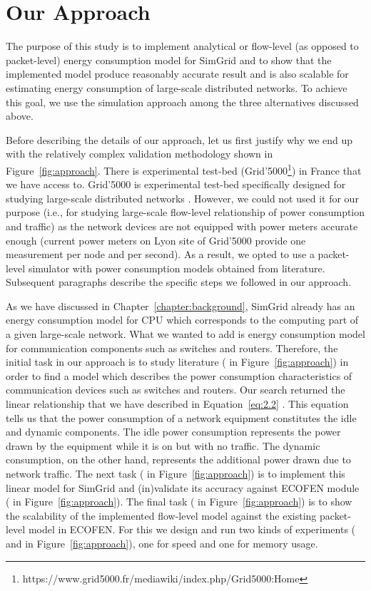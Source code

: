\section{Our Approach}
\label{section:ourapproach}
The purpose of this study is to implement analytical or flow-level (as opposed to packet-level) energy consumption model for SimGrid and to show that the implemented model produce reasonably accurate result and is also scalable for estimating energy consumption of large-scale distributed networks. To achieve this goal, we use the simulation approach among the three alternatives discussed above. 

Before describing the details of our approach, let us first justify why we end up with the relatively complex validation methodology shown in Figure~\ref{fig:approach}. There is experimental test-bed (Grid'5000\footnote{https://www.grid5000.fr/mediawiki/index.php/Grid5000:Home}) in France that we have access to. Grid'5000 is experimental test-bed specifically designed for studying large-scale distributed networks \cite{DBLP:journals/ijhpca/BolzeCCDDJJLLMMNPQRTT06}. However, we could not used it for our purpose (i.e., for studying large-scale flow-level relationship of power consumption and traffic) as the network devices are not equipped with power meters accurate enough (current power meters on Lyon site of Grid'5000 provide one measurement per node and per second). As a result, we opted to use a packet-level simulator with power consumption models obtained from literature. Subsequent paragraphs describe the specific steps we followed in our approach.

As we have discussed in Chapter~\ref{chapter:background}, SimGrid already has an energy consumption model for CPU which corresponds to the computing part of a given large-scale network. What we wanted to add is energy consumption model for communication components such as switches and routers. Therefore, the initial task in our approach is to study literature ( in Figure~\ref{fig:approach}) in order to find a model which describes the power consumption characteristics of communication devices such as switches and routers. Our search returned the linear relationship that we have described in Equation~\ref{eq:2.2} \cite{Sivaraman,DBLP:journals/comcom/BeisterDAK14,DBLP:conf/networking/MahadevanSBR09,DBLP:conf/sigcomm/MahadevanBS10}. This equation tells us that the power consumption of a network equipment constitutes the idle and dynamic components. The idle power consumption represents the power drawn by the equipment while it is on but with no traffic. The dynamic consumption, on the other hand, represents the additional power drawn due to network traffic. The next task ( in Figure~\ref{fig:approach}) is to implement this linear model for SimGrid and (in)validate its accuracy against ECOFEN module ( in Figure~\ref{fig:approach})\cite{DBLP:conf/wowmom/OrgerieLLL11,DBLP:conf/cloudnet/CorneaOL14}. The final task ( in Figure~\ref{fig:approach}) is to show the scalability of the implemented flow-level model against the existing packet-level model in ECOFEN. For this we design and run two kinds of experiments ( and  in Figure~\ref{fig:approach}), one for speed and one for memory usage. 

